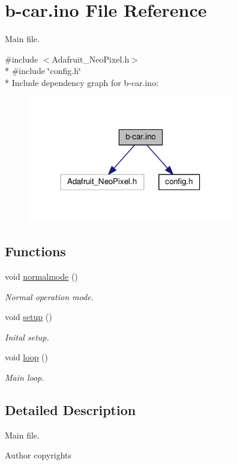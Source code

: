 \hypertarget{b-car_8ino}{}\section{b-\/car.ino File Reference}
\label{b-car_8ino}


Main file.  


{\ttfamily \#include $<$Adafruit\+\_\+\+Neo\+Pixel.\+h$>$}\\*
{\ttfamily \#include \char`\"{}config.\+h\char`\"{}}\\*
Include dependency graph for b-\/car.ino\+:\nopagebreak
\begin{figure}[H]
\begin{center}
\leavevmode
\includegraphics[width=254pt]{b-car_8ino__incl}
\end{center}
\end{figure}
\subsection*{Functions}
\begin{DoxyCompactItemize}
\item 
void \hyperlink{group__car_gaa0a39b0689218537e29a29f9c3f2af47}{normalmode} ()
\begin{DoxyCompactList}\small\item\em Normal operation mode. \end{DoxyCompactList}\end{DoxyCompactItemize}
{\bf }\par
\begin{DoxyCompactItemize}
\item 
void \hyperlink{group__main_ga4fc01d736fe50cf5b977f755b675f11d}{setup} ()
\begin{DoxyCompactList}\small\item\em Inital setup. \end{DoxyCompactList}\item 
void \hyperlink{group__main_gafe461d27b9c48d5921c00d521181f12f}{loop} ()
\begin{DoxyCompactList}\small\item\em Main loop. \end{DoxyCompactList}\end{DoxyCompactItemize}



\subsection{Detailed Description}
Main file. 

\begin{DoxyAuthor}{Author}
copyrights 
\end{DoxyAuthor}
